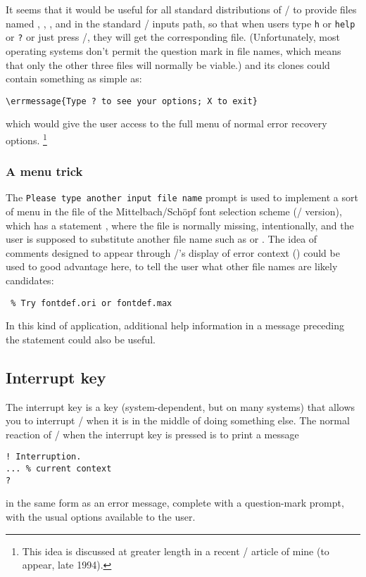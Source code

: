 {It seems that it would be useful for all standard distributions of
\tex/ to provide files named , , , and
 in the standard \tex/ inputs path, so that when users type
\verb'h' or \verb'help' or \verb'?' or just press \return/, they will
get the corresponding file. (Unfortunately, most operating systems
don't permit the question mark in file names, which means that only
the other three files will normally be viable.)  and its
clones could contain something as simple as:
 \begin{verbatim}
\errmessage{Type ? to see your options; X to exit}
\end{verbatim}
 which would give the user access to the full menu of normal error
recovery options.%
\footnote{This idea is discussed at greater length in a recent \tugboat/
article of mine (to appear, late 1994).}

\subsubsection{A menu trick}
 The {\tt Please type another input file name} prompt is used to
implement a sort of menu in the file  of the
Mittelbach/Sch\"opf font selection scheme (\latex/ version), which
has a statement  , where the file
 is normally missing, intentionally, and the user is
supposed to substitute another file name such as  or
. The idea of comments designed to appear through
\tex/'s display of error context ()
could be used to good advantage here, to
tell the user what other file names are likely
candidates:
 \begin{verbatim}
 % Try fontdef.ori or fontdef.max
\end{verbatim}
In this kind of application, additional help information in a message
preceding the  statement could also be useful.

\subsection{Interrupt key}
 The interrupt key is a key (system-dependent, but  on many
systems) that allows you to interrupt
\tex/ when it is in the middle of doing something else.  The normal
reaction of \tex/ when the interrupt key is pressed is to print a
message
 \begin{verbatim}
! Interruption.
... % current context
?
\end{verbatim}
 in the same form as an error message, complete with a question-mark
prompt, with the usual options available to the user.

}
